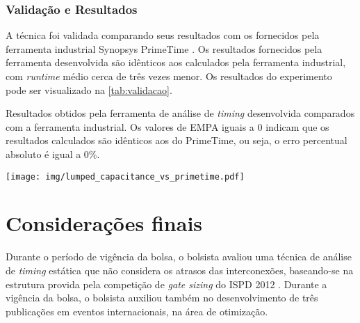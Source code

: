 \documentclass[
	12pt,				%
	openright,			%
	twoside,			%
	a4paper,			%
	english,			%
	french,				%
	spanish,			%
	brazil,				%
	]{abntex2}
\begin{document}
\subsection{Validação e Resultados}

A técnica foi validada comparando seus resultados com os fornecidos pela ferramenta industrial Synopsys \textregistered PrimeTime \texttrademark. Os resultados fornecidos pela ferramenta desenvolvida são idênticos aos calculados pela ferramenta industrial, com \textit{runtime} médio cerca de três vezes menor. Os resultados do experimento pode ser visualizado na \autoref{tab:validacao}.

\begin{table}[htbp]
	\centering
	\caption{\label{tab:validacao}Resultados obtidos pela ferramenta de análise de \textit{timing} desenvolvida comparados com a ferramenta industrial. Os valores de EMPA iguais a 0 indicam que os resultados calculados são idênticos aos do PrimeTime, ou seja, o erro percentual absoluto é igual a 0\%.}
	\texttt{[image: img/lumped\_capacitance\_vs\_primetime.pdf]} 
\end{table}


\chapter*[Considerações finais]{Considerações finais}

Durante o período de vigência da bolsa, o bolsista avaliou uma técnica de análise de \textit{timing} estática que não considera os atrasos das interconexões, baseando-se na estrutura provida pela competição de \textit{gate sizing} do ISPD 2012 \cite{ozdal2012ispd}. Durante a vigência da bolsa, o bolsista auxiliou também no desenvolvimento de três publicações em eventos internacionais, na área de otimização. 



\postextual


\end{document}
